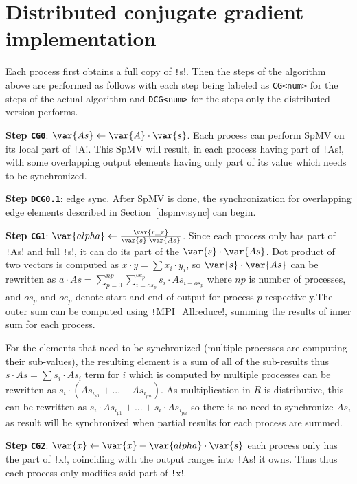 \documentclass[thesis=M,english]{FITthesis}[2019/12/23]
\newcommand{\csre}[1]{\texttt!#1!}
\begin{document}
\section{Distributed conjugate gradient implementation}\label{dcg:steps}

Each process first obtains a full copy of \csre{s}.
Then the steps of the algorithm above are performed as follows with each step being labeled as 
\texttt{CG<num>} for the steps of the actual algorithm and \texttt{DCG<num>} for the steps 
only the distributed version performs.

\textbf{Step \texttt{CG0}}: $\var{As} \gets \var{A} \cdot \var{s}$. Each process can perform SpMV on its local part of
\csre{A}. This SpMV will result, in each process having part of \csre{As}, with some overlapping
output elements having only part of its value which needs to be synchronized.

\textbf{Step \texttt{DCG0.1}}: edge sync. After SpMV is done, the synchronization for overlapping 
edge elements described in Section~\ref{dspmv:sync} can begin.

\textbf{Step \texttt{CG1}}: $\var{alpha} \gets \frac{\var{r\_r}}{\var{s} \cdot \var{As}}$. Since each process only has part of
\csre{As} and full \csre{s}, it can do its part of the $\var{s} \cdot \var{As}$.
Dot product of two vectors is computed as $x \cdot y = \sum x_i \cdot y_i$, so $\var{s} \cdot \var{As}$
can be rewritten as $a \cdot As = \sum_{p=0}^{np} \sum_{i=os_p}^{oe_p} s_i \cdot As_{i-os_p}$ where
$np$ is number of processes, and $os_p$ and $oe_p$ denote start and end of output for process
$p$ respectively.The outer sum can be computed using \csre{MPI_Allreduce},
summing the results of inner sum for each process.

For the elements that need to be synchronized (multiple processes are computing their sub-values),
the resulting element is a sum of all of the sub-results thus $s \cdot As = \sum s_i \cdot As_i$ term for $i$
which is computed by multiple processes can be rewritten as $s_i \cdot (As_{i_{p1}} + ... + As_{i_{pn}})$.
As multiplication in $R$ is distributive, this can be rewritten as $s_i \cdot As_{i_{p1}} + ... + s_i \cdot As_{i_{pn}}$
so there is no need to synchronize $As_i$ as result will be synchronized when partial results for
each process are summed.

\textbf{Step \texttt{CG2}}: $\var{x} \gets \var{x} + \var{alpha} \cdot \var{s}$ each process only has the part of \csre{x},
coinciding with the output ranges into \csre{As} it owns. Thus thus each process only
modifies said part of \csre{x}.
\end{document}
